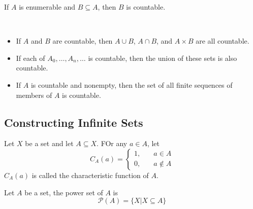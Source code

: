 \begin{proposition}
    \label{prop:SubsetOfEnumerableSetsIsCountable}
    If $A$ is enumerable and $B \subseteq A$, then $B$ is countable.
\end{proposition}

\begin{theorem}
    \label{thm:LotsOfCountableSets}
    ~{}
    \begin{itemize}
        \item If $A$ and $B$ are countable, then $A \cup B$, $A \cap B$, and $A \times B$ are all countable.
        \item If each of $A_0, \dots, A_n, \dots$ is countable, then the union of these sets is also countable.
        \item If $A$ is countable and nonempty, then the set of all finite sequences of members of $A$ is countable.
    \end{itemize}
\end{theorem}

\subsection{Constructing Infinite Sets}
\label{sub:ConstructingInfiniteSets}

\begin{definition}
    \label{def:CharacteristicFunctions}
    Let $X$ be a set and let $A \subseteq X$. FOr any $a \in A$, let
    $$ C_A(a) = \begin{cases}
        1, &\quad a \in A\\
        0, &\quad a \notin A
    \end{cases} $$
    $C_A(a)$ is called the characteristic function of $A$.
\end{definition}

\begin{definition}    \label{def:PowerSets}
    Let $A$ be a set, the power set of $A$ is
    \[ \mathcal{P}(A) = \{ X|X \subseteq A \} \]
\end{definition}

